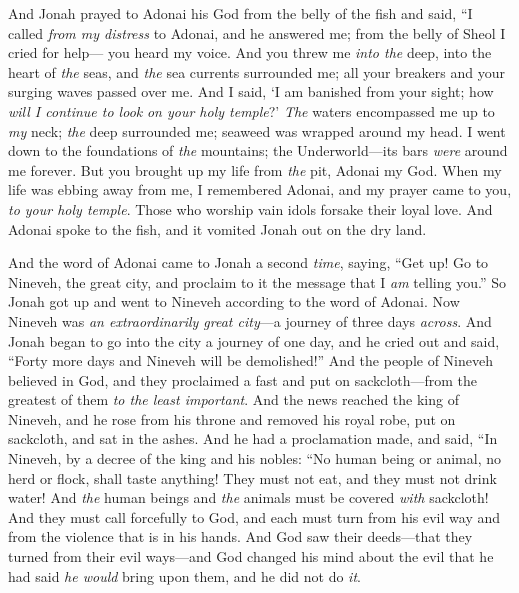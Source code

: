 \begin{biblechapter} %
\verse And Jonah prayed to Adonai his God from the belly of the fish
\verse and said,
\verse “I called \textit{from my distress} to Adonai, 
and he answered me; 
from the belly of Sheol I cried for help— 
you heard my voice.
\verse And you threw me \textit{into the} deep, 
into the heart of \textit{the} seas, 
and \textit{the} sea currents surrounded me; 
all your breakers and your surging waves 
passed over me.
\verse And I said, ‘I am banished 
from your sight; 
how \textit{will I continue to look} 
\textit{on your holy temple}?’
\verse \textit{The} waters encompassed me up to \textit{my} neck; 
\textit{the} deep surrounded me; 
seaweed was wrapped around my head.
\verse I went down to the foundations of \textit{the} mountains; 
the Underworld—its bars \textit{were} around me forever. 
But you brought up my life from \textit{the} pit, 
Adonai my God.
\verse When my life was ebbing away from me, 
I remembered Adonai, 
and my prayer came to you, 
\textit{to your holy temple}.
\verse Those who worship vain idols 
forsake their loyal love.
\verse And Adonai spoke to the fish, and it vomited Jonah out on the dry land.
\end{biblechapter}

\begin{biblechapter} %
 And the word of Adonai came to Jonah a second \textit{time}, saying,
\verse “Get up! Go to Nineveh, the great city, and proclaim to it the message that I \textit{am} telling you.”
\verse So Jonah got up and went to Nineveh according to the word of Adonai. Now Nineveh was \textit{an extraordinarily great city}—a journey of three days \textit{across}.
\verse And Jonah began to go into the city a journey of one day, and he cried out and said, “Forty more days and Nineveh will be demolished!”
\verse And the people of Nineveh believed in God, and they proclaimed a fast and put on sackcloth—from the greatest of them \textit{to the least important}.
 And the news reached the king of Nineveh, and he rose from his throne and removed his royal robe, put on sackcloth, and sat in the ashes.
\verse And he had a proclamation made, and said, “In Nineveh, by a decree of the king and his nobles:
\verse “No human being or animal, no herd or flock, shall taste anything! They must not eat, and they must not drink water!
\verse And \textit{the} human beings and \textit{the} animals must be covered \textit{with} sackcloth! And they must call forcefully to God, and each must turn from his evil way and from the violence that is in his hands.
\verse And God saw their deeds—that they turned from their evil ways—and God changed his mind about the evil that he had said \textit{he would} bring upon them, and he did not do \textit{it}.
\end{biblechapter}

